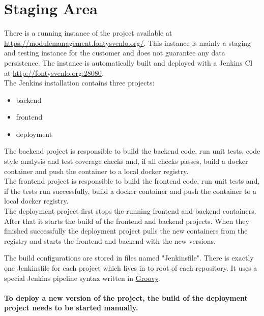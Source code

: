 \chapter{Staging Area}
\label{ch:staging}

There is a running instance of the project available at \url{https://modulemanagement.fontysvenlo.org/}.
This instance is mainly a staging and testing instance for the customer and does not guarantee any data persistence.
The instance is automatically built and deployed with a Jenkins CI at \url{http://fontysvenlo.org:28080}.
~\\
The Jenkins installation contains three projects:
\begin{itemize}
	\item backend
	\item frontend
	\item deployment
\end{itemize}


The backend project is responsible to build the backend code, run unit tests, code style analysis and test coverage checks and, if all checks passes, build a docker container and push the container to a local docker registry. \\

The frontend project is responsible to build the frontend code, run unit tests and, if the tests run successfully, build a docker container and push the container to a local docker registry. \\

The deployment project first stops the running frontend and backend containers. After that it starts the build of the frontend and backend projects. When they finished successfully the deployment project pulls the new containers from the registry and starts the frontend and backend with the new versions.

The build configurations are stored in files named "Jenkinsfile". There is exactly one Jenkinsfile for each project which lives in to root of each repository.
It uses a special Jenkins pipeline syntax written in \href{https://en.wikipedia.org/wiki/Groovy_(programming_language)}{Groovy}. \\
\\
\textbf{To deploy a new version of the project, the build of the deployment project needs to be started manually.}